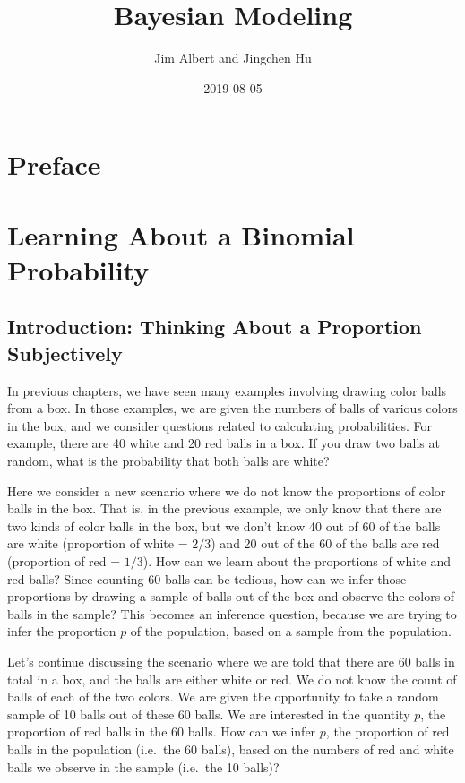 \documentclass[]{book}
\title{Bayesian Modeling}
\author{Jim Albert and Jingchen Hu}
\date{2019-08-05}
\begin{document}
\maketitle

{
\setcounter{tocdepth}{1}
\tableofcontents
}
\hypertarget{preface}{%
\chapter{Preface}\label{preface}}

\hypertarget{intro}{%
\chapter{Learning About a Binomial Probability}\label{intro}}

\hypertarget{introduction-thinking-about-a-proportion-subjectively}{%
\section{Introduction: Thinking About a Proportion Subjectively}\label{introduction-thinking-about-a-proportion-subjectively}}

In previous chapters, we have seen many examples involving drawing color balls from a box. In those examples, we are given the numbers of balls of various colors in the box, and we consider questions related to calculating probabilities. For example, there are 40 white and 20 red balls in a box. If you draw two balls at random, what is the probability that both balls are white?

Here we consider a new scenario where we do not know the proportions of color balls in the box. That is, in the previous example, we only know that there are two kinds of color balls in the box, but we don't know 40 out of 60 of the balls are white (proportion of white = \(2/3\)) and 20 out of the 60 of the balls are red (proportion of red = \(1/3\)). How can we learn about the proportions of white and red balls? Since counting 60 balls can be tedious, how can we infer those proportions by drawing a sample of balls out of the box and observe the colors of balls in the sample? This becomes an inference question, because we are trying to infer the proportion \(p\) of the population, based on a sample from the population.

Let's continue discussing the scenario where we are told that there are 60 balls in total in a box, and the balls are either white or red. We do not know the count of balls of each of the two colors.
We are given the opportunity to take a random sample of 10 balls out of these 60 balls. We are interested in the quantity \(p\), the proportion of red balls in the 60 balls. How can we infer \(p\), the proportion of red balls in the population (i.e.~the 60 balls), based on the numbers of red and white balls we observe in the sample (i.e.~the 10 balls)?
\end{document}
